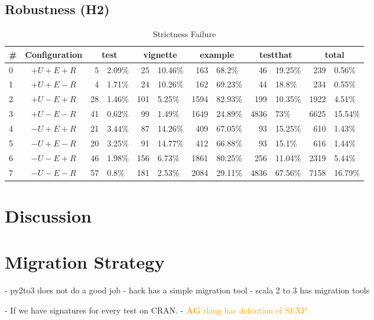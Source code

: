 \documentclass[review,nonacm,screen,acmsmall,anonymous=true]{acmart}
\newcommand{\authorcomment}[3]{\xspace\textcolor{#1}{{\bf #2} #3}\xspace}
\newcommand{\AG}[1]{\authorcomment{orange}{AG}{#1}}
\begin{document}
\subsection{Robustness (H2)} \label{Evaluation:Robustness}

\begin{table}
  \vspace{-3mm}
  \small
  \caption{Strictness Failure} \label{table:strictfail}
  \centering
  \begin{tabular}{lcr|lr|lr|lr|lr|l}
    \toprule
    \#&\textbf{Configuration}&\multicolumn{2}{c}{\textbf{test}}&\multicolumn{2}{c}{\textbf{vignette}}&\multicolumn{2}{c}{\textbf{example}}&\multicolumn{2}{c}{\textbf{testthat}}&\multicolumn{2}{c}{\textbf{total}}\\
    \midrule
    0&$+U+E+R$&5&2.09\%&25&10.46\%&163&68.2\%&46&19.25\%&239&0.56\%\\
    1&$+U+E-R$&4&1.71\%&24&10.26\%&162&69.23\%&44&18.8\%&234&0.55\%\\
    2&$+U-E+R$&28&1.46\%&101&5.25\%&1594&82.93\%&199&10.35\%&1922&4.51\%\\
    3&$+U-E-R$&41&0.62\%&99&1.49\%&1649&24.89\%&4836&73\%&6625&15.54\%\\
    4&$-U+E+R$&21&3.44\%&87&14.26\%&409&67.05\%&93&15.25\%&610&1.43\%\\
    5&$-U+E-R$&20&3.25\%&91&14.77\%&412&66.88\%&93&15.1\%&616&1.44\%\\
    6&$-U-E+R$&46&1.98\%&156&6.73\%&1861&80.25\%&256&11.04\%&2319&5.44\%\\
    7&$-U-E-R$&57&0.8\%&181&2.53\%&2084&29.11\%&4836&67.56\%&7158&16.79\%\\
    \bottomrule
  \end{tabular}
\end{table}

\section{Discussion}



\section{Migration Strategy}
- py2to3 does not do a good job
- hack has a simple migration tool
- scala 2 to 3 has migration tools

- If we have signatures for every test on CRAN.
-
\AG{rlang has defiintion of SEXP.}


\end{document}
